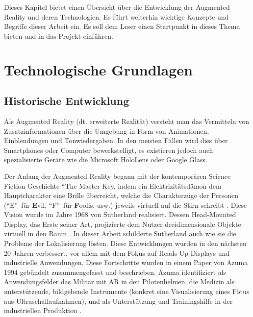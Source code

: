 \documentclass[a4paper]{scrreprt}
\begin{document}
Dieses Kapitel bietet einen Übersicht über die Entwicklung der Augmented Reality und deren Technologien. Es führt weiterhin wichtige Konzepte und Begriffe dieser Arbeit ein. Es soll dem Leser einen Startpunkt in dieses Thema bieten und in das Projekt einführen.

\section{Technologische Grundlagen}

\subsection{Historische Entwicklung}

Als Augmented Reality (dt. erweiterte Realität) versteht man das Vermitteln von Zusatzinformationen über die Umgebung in Form von Animationen, Einblendungen und Tonwiedergaben. In den meisten Fällen wird dies über Smartphones oder Computer bewerkstelligt, es existieren jedoch auch spezialisierte Geräte wie die Microsoft HoloLens oder Google Glass.

Der Anfang der Augmented Reality begann mit der kontemporären Science Fiction Geschichte \textquotedblleft The Master Key, indem ein Elektrizitätsdämon dem Hauptcharakter eine Brille überreicht, welche die Charakterzüge der Personen (\textquotedblleft E\textquotedblright\ für \textbf{E}vil, \textquotedblleft F\textquotedblright\ für \textbf{F}oolis, usw.) jeweils virtuell auf die Stirn schreibt \parencite{Baum1901}. 
Diese Vision wurde im Jahre 1968 von Sutherland realisiert. Dessen Head-Mounted Display, das Erste seiner Art, projizierte dem Nutzer dreidimensionale Objekte virtuell in den Raum \parencite{Sutherland1968}. In dieser Arbeit schilderte Sutherland auch wie sie die Probleme der Lokalisierung lösten. Diese Entwicklungen wurden in den nächsten 20 Jahren verbessert, vor allem mit dem Fokus auf Heads Up Displays und industrielle Anwendungen. Diese Fortschritte wurden in einem Paper von Azuma 1994 gebündelt zusammengefasst und beschrieben. Azuma identifiziert als Anwendungsfelder das Militär mit AR in den Pilotenhelmen, die Medizin als unterstützende, bildgebende Instrumente (konkret eine Visualisierung eines Fötus aus Ultraschallaufnahmen), und als Unterstützung und Trainingshilfe in der industriellen Produktion \parencite{Azuma1997}.
\end{document}
